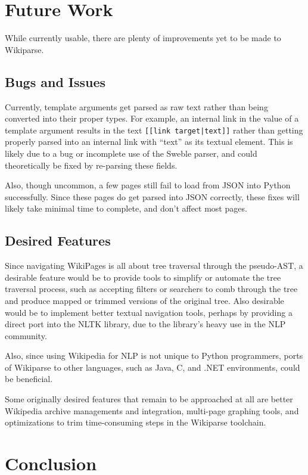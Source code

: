 \section{Future Work}

While currently usable, there are plenty of improvements yet to be made to Wikiparse.

\subsection{Bugs and Issues}

Currently, template arguments get parsed as raw text rather than being converted into their proper types. For example, an internal link in the value of a template argument results in the text \verb![[link target|text]]! rather than getting properly parsed into an internal link with ``text'' as its textual element. This is likely due to a bug or incomplete use of the Sweble parser, and could theoretically be fixed by re-parsing these fields.

Also, though uncommon, a few pages still fail to load from JSON into Python successfully. Since these pages do get parsed into JSON correctly, these fixes will likely take minimal time to complete, and don't affect most pages.

\subsection{Desired Features}

Since navigating WikiPages is all about tree traversal through the pseudo-AST, a desirable feature would be to provide tools to simplify or automate the tree traversal process, such as accepting filters or searchers to comb through the tree and produce mapped or trimmed versions of the original tree. Also desirable would be to implement better textual navigation tools, perhaps by providing a direct port into the NLTK library, due to the library's heavy use in the NLP community.

Also, since using Wikipedia for NLP is not unique to Python programmers, ports of Wikiparse to other languages, such as Java, C, and .NET environments, could be beneficial.

Some originally desired features that remain to be approached at all are better Wikipedia archive managements and integration, multi-page graphing tools, and optimizations to trim time-consuming steps in the Wikiparse toolchain.

\section{Conclusion}

